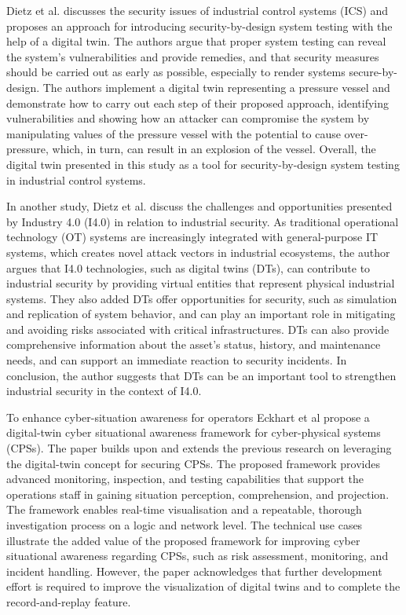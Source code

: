 Dietz et al.\cite{dietzEmployingDigitalTwins2022} discusses the security issues of industrial control systems (ICS) and proposes an approach for introducing security-by-design system testing with the help of a digital twin. The authors argue that proper system testing can reveal the system’s vulnerabilities and provide remedies, and that security measures should be carried out as early as possible, especially to render systems secure-by-design. The authors implement a digital twin representing a pressure vessel and demonstrate how to carry out each step of their proposed approach, identifying vulnerabilities and showing how an attacker can compromise the system by manipulating values of the pressure vessel with the potential to cause over-pressure, which, in turn, can result in an explosion of the vessel. Overall, the digital twin presented in this study as a tool for security-by-design system testing in industrial control systems.


In another study, Dietz et al.\cite{dietzUnleashingDigitalTwin2020} discuss the challenges and opportunities presented by Industry 4.0 (I4.0) in relation to industrial security. As traditional operational technology (OT) systems are increasingly integrated with general-purpose IT systems, which creates novel attack vectors in industrial ecosystems, the author argues that I4.0 technologies, such as digital twins (DTs), can contribute to industrial security by providing virtual entities that represent physical industrial systems. They also added DTs offer opportunities for security, such as simulation and replication of system behavior, and can play an important role in mitigating and avoiding risks associated with critical infrastructures. DTs can also provide comprehensive information about the asset's status, history, and maintenance needs, and can support an immediate reaction to security incidents. In conclusion, the author suggests that DTs can be an important tool to strengthen industrial security in the context of I4.0.


To enhance cyber-situation awareness for operators Eckhart et al\cite{eckhartEnhancingCyberSituational2019} propose a digital-twin cyber situational awareness framework for cyber-physical systems (CPSs). The paper builds upon and extends the previous research on leveraging the digital-twin concept for securing CPSs. The proposed framework provides advanced monitoring, inspection, and testing capabilities that support the operations staff in gaining situation perception, comprehension, and projection. The framework enables real-time visualisation and a repeatable, thorough investigation process on a logic and network level. The technical use cases illustrate the added value of the proposed framework for improving cyber situational awareness regarding CPSs, such as risk assessment, monitoring, and incident handling. However, the paper acknowledges that further development effort is required to improve the visualization of digital twins and to complete the record-and-replay feature. 


